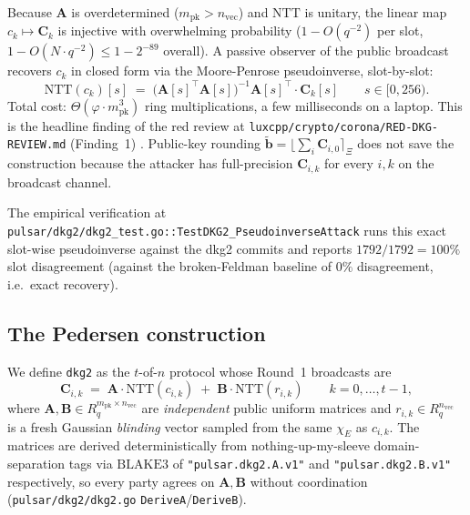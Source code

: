 Because $\mathbf{A}$ is overdetermined ($m_{\textrm{pk}} > n_{\textrm{vec}}$)
and $\mathrm{NTT}$ is unitary, the linear map $c_k \mapsto \mathbf{C}_k$
is injective with overwhelming probability ($1 - O(q^{-2})$ per slot,
$1 - O(N \cdot q^{-2}) \le 1 - 2^{-89}$ overall). A passive observer of
the public broadcast recovers $c_k$ in closed form via the Moore-Penrose
pseudoinverse, slot-by-slot:
\begin{equation}
\label{eq:pseudoinverse-attack}
\mathrm{NTT}(c_k)[s]
\;=\; \bigl(\mathbf{A}[s]^{\top}\mathbf{A}[s]\bigr)^{-1}
       \mathbf{A}[s]^{\top}\cdot\mathbf{C}_k[s]
\qquad s\in[0,256).
\end{equation}
Total cost: $\Theta(\varphi\cdot m_{\textrm{pk}}^3)$ ring multiplications,
a few milliseconds on a laptop. This is the headline finding of the red
review at
\texttt{luxcpp/crypto/corona/RED-DKG-REVIEW.md} (Finding~1)
\cite{red-dkg-review}. Public-key rounding
$\tilde{\mathbf{b}} = \lfloor\sum_i \mathbf{C}_{i,0}\rceil_\Xi$ does not
save the construction because the attacker has full-precision
$\mathbf{C}_{i,k}$ for every $i,k$ on the broadcast channel.

The empirical verification at
\texttt{pulsar/dkg2/dkg2\_test.go::TestDKG2\_PseudoinverseAttack} runs
this exact slot-wise pseudoinverse against the dkg2 commits and reports
$1792/1792 = 100\%$ slot disagreement (against the broken-Feldman
baseline of $0\%$ disagreement, i.e.\ exact recovery).

\subsection{The Pedersen construction}
\label{ssec:pedersen-construction}

We define \texttt{dkg2} as the $t$-of-$n$ protocol whose Round~1
broadcasts are
\begin{equation}
\label{eq:pedersen-commit}
\mathbf{C}_{i,k} \;=\; \mathbf{A}\cdot\mathrm{NTT}(c_{i,k}) \;+\; \mathbf{B}\cdot\mathrm{NTT}(r_{i,k})
\qquad k=0,\dots,t-1,
\end{equation}
where $\mathbf{A}, \mathbf{B} \in R_q^{m_{\textrm{pk}} \times n_{\textrm{vec}}}$
are \emph{independent} public uniform matrices and
$r_{i,k} \in R_q^{n_{\textrm{vec}}}$ is a fresh Gaussian \emph{blinding}
vector sampled from the same $\chi_E$ as $c_{i,k}$. The matrices are
derived deterministically from nothing-up-my-sleeve domain-separation
tags via $\mathrm{BLAKE3}$ of \texttt{"pulsar.dkg2.A.v1"} and
\texttt{"pulsar.dkg2.B.v1"} respectively, so every party agrees on
$\mathbf{A}, \mathbf{B}$ without coordination
(\texttt{pulsar/dkg2/dkg2.go} \texttt{DeriveA}/\texttt{DeriveB}).

